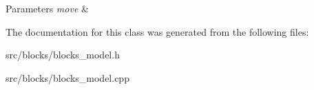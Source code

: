 \begin{DoxyParams}{Parameters}
{\em move} & \\
\hline
\end{DoxyParams}


The documentation for this class was generated from the following files\+:\begin{DoxyCompactItemize}
\item 
src/blocks/blocks\+\_\+model.\+h\item 
src/blocks/blocks\+\_\+model.\+cpp\end{DoxyCompactItemize}
